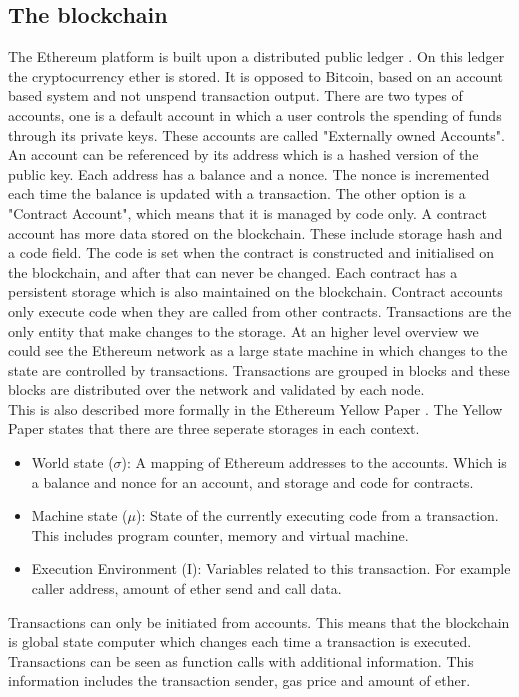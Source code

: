 \documentclass[a4paper]{article}
\begin{document}
\subsection{The blockchain}
The Ethereum platform is built upon a distributed public ledger . On this ledger the cryptocurrency ether is stored. It is opposed to Bitcoin, based on an account based system and not unspend transaction output. There are two types of accounts, one is a default account in which a user controls the spending of funds through its private keys. These accounts are called "Externally owned Accounts". An account can be referenced by its address which is a hashed version of the public key. Each address has a balance and a nonce. The nonce is incremented each time the balance is updated with a transaction. The other option is a "Contract Account", which means that it is managed by code only. A contract account has more data stored on the blockchain. These include storage hash and a code field. The code is set when the contract is constructed and initialised on the blockchain, and after that can never be changed. Each contract has a persistent storage which is also maintained on the blockchain. Contract accounts only execute code when they are called from other contracts. Transactions are the only entity that make changes to the storage. At an higher level overview we could see the Ethereum network as a large state machine in which changes to the state are controlled by transactions. Transactions are grouped in blocks and these blocks are distributed over the network and validated by each node. \\
This is also described more formally in the Ethereum Yellow Paper \cite{wood2014ethereum}. The Yellow Paper states that there are three seperate storages in each context.
\begin{itemize}
    \item World state ($\sigma$): A mapping of Ethereum addresses to the accounts. Which is a balance and nonce for an account, and storage and code for contracts.
    \item  Machine state ($\mu$): State of the currently executing code from a transaction. This includes program counter, memory and virtual machine.
    \item Execution Environment (I): Variables related to this transaction. For example caller address, amount of ether send and call data.
\end{itemize}
Transactions can only be initiated from accounts. This means that the blockchain is global state computer which changes each time a transaction is executed. Transactions can be seen as function calls with additional information. This information includes the transaction sender, gas price and amount of ether.\\
\end{document}

